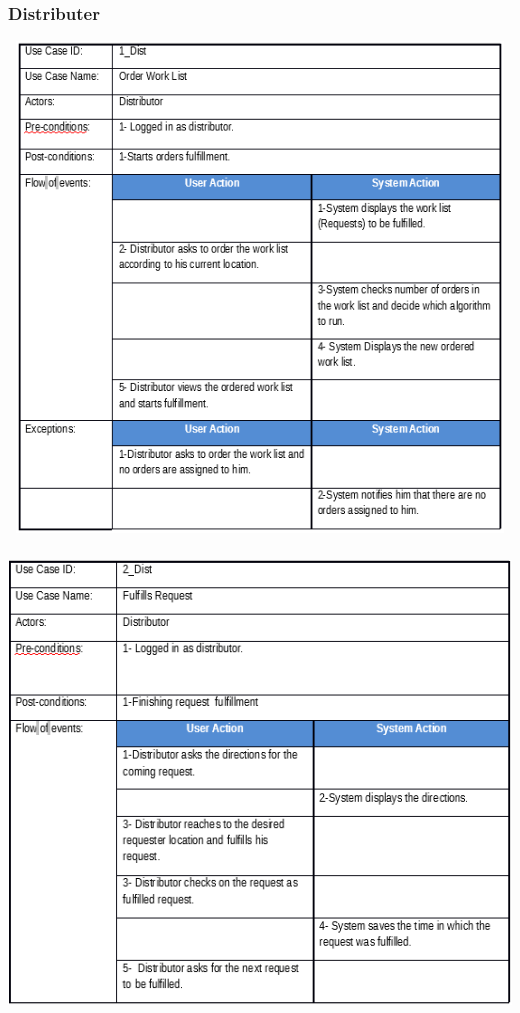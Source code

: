 \documentclass[12pt]{article}
\begin{document}
\subsubsection{ Distributer }
\begin{center}
	\includegraphics[width=17cm,height=13cm]{./assets/usecasetable/distributer-1.png}\\
	\includegraphics[width=17cm,height=13cm]{./assets/usecasetable/distributer-2.png}\\
\end{center}
\end{document}
